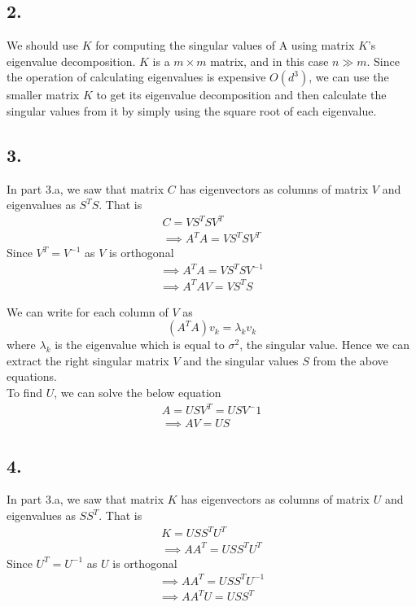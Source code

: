 \documentclass[11pt]{article}
\begin{document}
{\pagebreak[4]
\subsection*{2.}

We should use $K$ for computing the singular values of A using matrix $K$'s eigenvalue decomposition. $K$ is a $m \times m$ matrix, and in this case $n \gg m$. Since the operation of calculating eigenvalues is expensive $O(d^3)$, we can use the smaller matrix $K$ to get its eigenvalue decomposition and then calculate the singular values from it by simply using the square root of each eigenvalue.

\pagebreak[4]
\subsection*{3.}

In part 3.a, we saw that matrix $C$ has eigenvectors as columns of matrix $V$ and eigenvalues as $S^T S$. That is
\begin{align*}
C = V S^T S V^T\\
\implies A^T A = V S^T S V^T
\end{align*}
Since $V^T = V^{-1}$ as $V$ is orthogonal
\begin{align*}
\implies A^T A = V S^T S V^{-1}\\
\implies A^T A V = V S^T S
\end{align*}

We can write for each column of $V$ as
$$(A^TA) v_k = \lambda_k v_k$$ where $\lambda_k$ is the eigenvalue which is equal to $\sigma^2$, the singular value. Hence we can extract the right singular matrix $V$ and the singular values $S$ from the above equations.\\

To find $U$, we can solve the below equation
\begin{align*}
A = U S V^T = U S V^-1\\
\implies A V = U S
\end{align*}	

\pagebreak[4]
\subsection*{4.}

In part 3.a, we saw that matrix $K$ has eigenvectors as columns of matrix $U$ and eigenvalues as $S S^T$. That is
\begin{align*}
K = U S S^T U^T\\
\implies A A^T = U S S^T U^T
\end{align*}
Since $U^T = U^{-1}$ as $U$ is orthogonal
\begin{align*}
\implies A A^T = U S S^T U^{-1}\\
\implies A A^T U = U S S^T
\end{align*}

}
\end{document}

